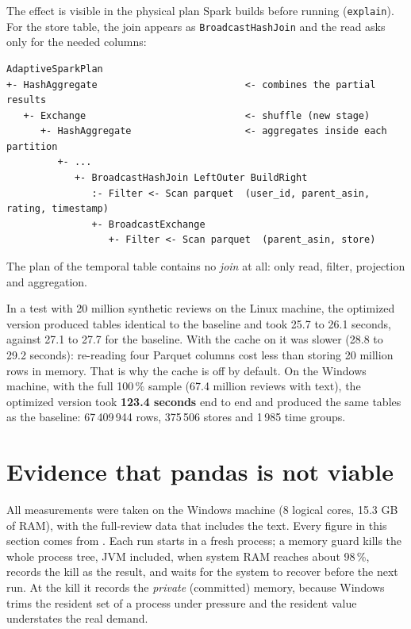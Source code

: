 \documentclass[11pt,a4paper]{article}
\begin{document}
The effect is visible in the physical plan Spark builds before running (\texttt{explain}).
For the store table, the join appears as \texttt{BroadcastHashJoin} and the read asks only
for the needed columns:

\begin{lstlisting}[language={},caption={Physical plan of the store table (optimized version).}]
AdaptiveSparkPlan
+- HashAggregate                          <- combines the partial results
   +- Exchange                            <- shuffle (new stage)
      +- HashAggregate                    <- aggregates inside each partition
         +- ...
            +- BroadcastHashJoin LeftOuter BuildRight
               :- Filter <- Scan parquet  (user_id, parent_asin, rating, timestamp)
               +- BroadcastExchange
                  +- Filter <- Scan parquet  (parent_asin, store)
\end{lstlisting}

The plan of the temporal table contains no \emph{join} at all: only read, filter, projection
and aggregation.

In a test with 20 million synthetic reviews on the Linux machine, the optimized version
produced tables identical to the baseline and took 25.7 to 26.1 seconds, against 27.1 to
27.7 for the baseline. With the cache on it was slower (28.8 to 29.2 seconds): re-reading
four Parquet columns cost less than storing 20 million rows in memory. That is why the cache
is off by default. On the Windows machine, with the full 100\,\% sample (67.4 million reviews
with text), the optimized version took \textbf{123.4 seconds} end to end and produced the same
tables as the baseline: 67\,409\,944 rows, 375\,506 stores and 1\,985 time groups.

\section{Evidence that pandas is not viable}
\label{sec:evidence}

All measurements were taken on the Windows machine (8 logical cores, 15.3 GB of RAM), with
the full-review data that includes the text. Every figure in this section comes from
. Each run starts in a fresh process; a
memory guard kills the whole process tree, JVM included, when system RAM reaches about
98\,\%, records the kill as the result, and waits for the system to recover before the next
run. At the kill it records the \emph{private} (committed) memory, because Windows trims the
resident set of a process under pressure and the resident value understates the real demand.
\end{document}
